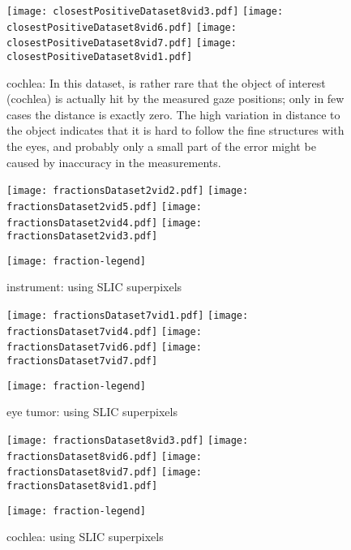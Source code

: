 \begin{figure}[ht]
	  \texttt{[image: closestPositiveDataset8vid3.pdf]}
	  \texttt{[image: closestPositiveDataset8vid6.pdf]}
	  \texttt{[image: closestPositiveDataset8vid7.pdf]}
	  \texttt{[image: closestPositiveDataset8vid1.pdf]}
	  \caption{cochlea: In this dataset, is rather rare that the object of interest (cochlea) is actually hit by the measured gaze positions; only in few cases the distance is exactly zero. The high variation in distance to the object indicates that it is hard to follow the fine structures with the eyes, and probably only a small part of the error might be caused by inaccuracy in the measurements.}
	\label{fig:distanceToClosestPositiveD8}
\end{figure}


\begin{figure}[ht]
	  \texttt{[image: fractionsDataset2vid2.pdf]}
	  \texttt{[image: fractionsDataset2vid5.pdf]}
	  \texttt{[image: fractionsDataset2vid4.pdf]}
	  \texttt{[image: fractionsDataset2vid3.pdf]}
	  
	  \centering
	  \texttt{[image: fraction-legend]}
	  \caption{instrument: using SLIC superpixels}
	\label{fig:positiveFractionD6}
\end{figure}

\begin{figure}[ht]
	  \texttt{[image: fractionsDataset7vid1.pdf]}
	  \texttt{[image: fractionsDataset7vid4.pdf]}
	  \texttt{[image: fractionsDataset7vid6.pdf]}
	  \texttt{[image: fractionsDataset7vid7.pdf]}
	  
	  \centering
	  \texttt{[image: fraction-legend]}
	  \caption{eye tumor: using SLIC superpixels}
	\label{fig:positiveFractionD7}
\end{figure}

\begin{figure}[ht]
	  \texttt{[image: fractionsDataset8vid3.pdf]}
	  \texttt{[image: fractionsDataset8vid6.pdf]}
	  \texttt{[image: fractionsDataset8vid7.pdf]}
	  \texttt{[image: fractionsDataset8vid1.pdf]}
	  
	  \centering
	  \texttt{[image: fraction-legend]}
	  \caption{cochlea: using SLIC superpixels}
	\label{fig:positiveFractionD8}
\end{figure}



